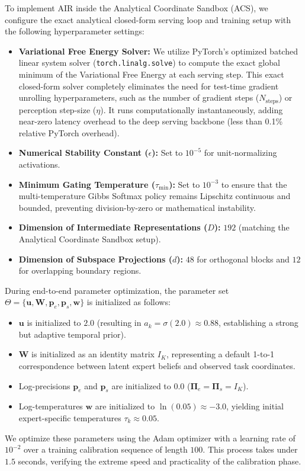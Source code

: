 \documentclass{article}
\theoremstyle{plain}
\theoremstyle{definition}
\theoremstyle{remark}
\begin{document}
To implement AIR inside the Analytical Coordinate Sandbox (ACS), we configure the exact analytical closed-form serving loop and training setup with the following hyperparameter settings:
\begin{itemize}
    \item \textbf{Variational Free Energy Solver:} We utilize PyTorch's optimized batched linear system solver (\texttt{torch.linalg.solve}) to compute the exact global minimum of the Variational Free Energy at each serving step. This exact closed-form solver completely eliminates the need for test-time gradient unrolling hyperparameters, such as the number of gradient steps ($N_{\text{steps}}$) or perception step-size ($\eta$). It runs computationally instantaneously, adding near-zero latency overhead to the deep serving backbone (less than 0.1\% relative PyTorch overhead).
    \item \textbf{Numerical Stability Constant ($\epsilon$):} Set to $10^{-5}$ for unit-normalizing activations.
    \item \textbf{Minimum Gating Temperature ($\tau_{\min}$):} Set to $10^{-3}$ to ensure that the multi-temperature Gibbs Softmax policy remains Lipschitz continuous and bounded, preventing division-by-zero or mathematical instability.
    \item \textbf{Dimension of Intermediate Representations ($D$):} $192$ (matching the Analytical Coordinate Sandbox setup).
    \item \textbf{Dimension of Subspace Projections ($d$):} $48$ for orthogonal blocks and $12$ for overlapping boundary regions.
\end{itemize}

During end-to-end parameter optimization, the parameter set $\Theta = \{\mathbf{u}, \mathbf{W}, \mathbf{p}_e, \mathbf{p}_s, \mathbf{w}\}$ is initialized as follows:
\begin{itemize}
    \item $\mathbf{u}$ is initialized to $2.0$ (resulting in $a_k = \sigma(2.0) \approx 0.88$, establishing a strong but adaptive temporal prior).
    \item $\mathbf{W}$ is initialized as an identity matrix $I_K$, representing a default 1-to-1 correspondence between latent expert beliefs and observed task coordinates.
    \item Log-precisions $\mathbf{p}_e$ and $\mathbf{p}_s$ are initialized to $0.0$ ($\mathbf{\Pi}_e = \mathbf{\Pi}_s = I_K$).
    \item Log-temperatures $\mathbf{w}$ are initialized to $\ln(0.05) \approx -3.0$, yielding initial expert-specific temperatures $\tau_k \approx 0.05$.
\end{itemize}
We optimize these parameters using the Adam optimizer with a learning rate of $10^{-2}$ over a training calibration sequence of length $100$. This process takes under $1.5$ seconds, verifying the extreme speed and practicality of the calibration phase.
\end{document}

